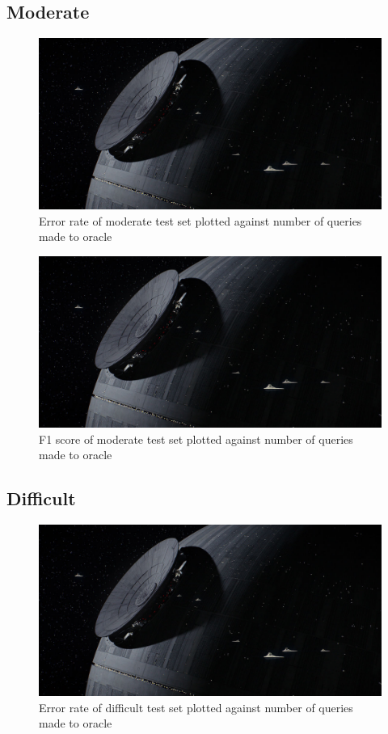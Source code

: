 \documentclass[paper=a4, fontsize=11pt]{scrartcl}
\numberwithin{equation}{section}    %
\numberwithin{figure}{section}      %
\numberwithin{table}{section}       %
\numberwithin{equation}{section}    %
\numberwithin{figure}{section}      %
\numberwithin{table}{section}       %
\begin{document}
\FloatBarrier
\subsection{Moderate}

\begin{figure}[!htb]
  \centering
  \includegraphics[scale = 0.35]{figures/fig.jpg}
      \caption{Error rate of moderate test set plotted against number of queries made to oracle}
      \label{moderror}
\end{figure}

\begin{figure}[!htb]
  \centering
  \includegraphics[scale = 0.35]{figures/fig.jpg}
      \caption{F1 score of moderate test set plotted against number of queries made to oracle}
      \label{modf}
\end{figure}
\FloatBarrier
\subsection{Difficult}


\begin{figure}[!htb]
  \centering
  \includegraphics[scale = 0.35]{figures/fig.jpg}
      \caption{Error rate of difficult test set plotted against number of queries made to oracle}
      \label{harderror}
\end{figure}
\end{document}
